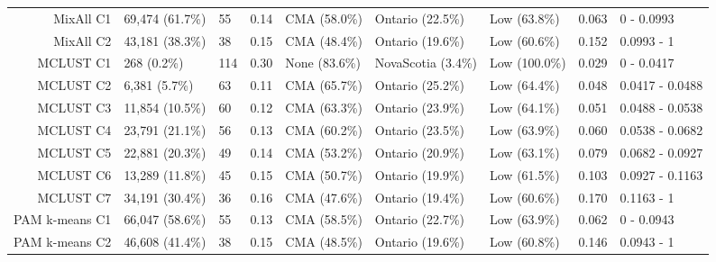 \documentclass[11pt, a4paper]{article}
\begin{document}
\begin{table}[H]
{\begin{tabular}{|r|llllllll|}
  MixAll C1 & 69,474 (61.7\%) & 55 & 0.14 & CMA (58.0\%) & Ontario (22.5\%) & Low (63.8\%) & 0.063 & 0 - 0.0993 \\
  MixAll C2 & 43,181 (38.3\%) & 38 & 0.15 & CMA (48.4\%) & Ontario (19.6\%) & Low (60.6\%) & 0.152 & 0.0993 - 1 \\
\rowcolor{gray!25}  MCLUST C1 & 268 (0.2\%) & 114 & 0.30 & None (83.6\%) & NovaScotia (3.4\%) & Low (100.0\%) & 0.029 & 0 - 0.0417 \\
\rowcolor{gray!25}  MCLUST C2 & 6,381 (5.7\%) & 63 & 0.11 & CMA (65.7\%) & Ontario (25.2\%) & Low (64.4\%) & 0.048 & 0.0417 - 0.0488 \\
\rowcolor{gray!25}  MCLUST C3 & 11,854 (10.5\%) & 60 & 0.12 & CMA (63.3\%) & Ontario (23.9\%) & Low (64.1\%) & 0.051 & 0.0488 - 0.0538 \\
 \rowcolor{gray!25} MCLUST C4 & 23,791 (21.1\%) & 56 & 0.13 & CMA (60.2\%) & Ontario (23.5\%) & Low (63.9\%) & 0.060 & 0.0538 - 0.0682 \\
 \rowcolor{gray!25} MCLUST C5 & 22,881 (20.3\%) & 49 & 0.14 & CMA (53.2\%) & Ontario (20.9\%) & Low (63.1\%) & 0.079 & 0.0682 - 0.0927 \\
\rowcolor{gray!25}  MCLUST C6 & 13,289 (11.8\%) & 45 & 0.15 & CMA (50.7\%) & Ontario (19.9\%) & Low (61.5\%) & 0.103 & 0.0927 - 0.1163 \\
\rowcolor{gray!25}  MCLUST C7 & 34,191 (30.4\%) & 36 & 0.16 & CMA (47.6\%) & Ontario (19.4\%) & Low (60.6\%) & 0.170 & 0.1163 - 1 \\
  PAM k-means C1 & 66,047 (58.6\%) & 55 & 0.13 & CMA (58.5\%) & Ontario (22.7\%) & Low (63.9\%) & 0.062 & 0 - 0.0943 \\
  PAM k-means C2 & 46,608 (41.4\%) & 38 & 0.15 & CMA (48.5\%) & Ontario (19.6\%) & Low (60.8\%) & 0.146 & 0.0943 - 1 \\
   \hline
\end{tabular}
}
\end{table}
\end{document}
